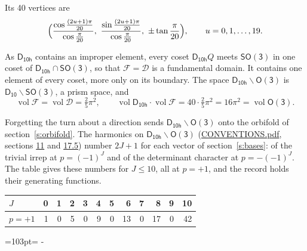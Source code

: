 \documentclass[10pt,a4paper]{article}
\newcommand{\needspace}[1]{\par\penalty-100\begingroup\dimen0=#1\relax\dimen2=\pagegoal
  \advance\dimen2-\pagetotal\ifdim\dimen0>\dimen2\relax\ifdim\dimen2>0pt\vfil\break\fi\fi
  \endgroup}
\numberwithin{equation}{section}
\newcommand{\grp}[1]{\mathsf{#1}}
\newcommand{\vol}{\operatorname{vol}}
\newcommand{\fcell}{\mathcal{D}}
\newcommand{\fdomain}{\mathcal{F}}
\begin{document}
\leavevmode\label{n:local.vertex.u}Its 40 vertices are
\begin{equation}\label{e:prism}\Bigl(\frac{\cos\frac{(2u+1)\pi}{20}}{\cos\frac{\pi}{20}},\ \frac{\sin\frac{(2u+1)\pi}{20}}{\cos\frac{\pi}{20}},\ \pm\tan\frac{\pi}{20}\Bigr),\qquad u = 0, 1, \dots, 19.\end{equation}

\leavevmode\label{n:set.fundamental}As $\grp{D_{10h}}$ contains an improper element, every coset $\grp{D_{10h}}Q$ meets \href{SO3.pdf}{$\grp{SO(3)}$} in one coset of $\grp{D_{10h}} \cap \grp{SO(3)}$, so that $\fdomain = \fcell$ is a fundamental domain. It contains one element of every coset, more only on its boundary.
The space $\grp{D_{10h}}\backslash\grp{O(3)}$ is $\grp{D_{10}}\backslash\grp{SO(3)}$, a prism space, and
\begin{equation}\label{e:volume}\vol\fdomain = \vol\fcell = \tfrac{2}{5}\pi^2,\qquad \vol\grp{D_{10h}}\cdot\vol\fdomain = 40\cdot \tfrac{2}{5}\pi^2 = 16\pi^2 = \vol\grp{O(3)}.\end{equation}

Forgetting the turn about a direction sends $\grp{D_{10h}}\backslash\grp{O(3)}$ onto the orbifold of section~\ref{s:orbifold}.
The harmonics on $\grp{D_{10h}}\backslash\grp{O(3)}$ (\href{../../CONVENTIONS.pdf}{CONVENTIONS.pdf}, sections \href{../../CONVENTIONS.pdf\#conv.11}{11} and \href{../../CONVENTIONS.pdf\#conv.17.5}{17.5}) number $2J + 1$ for each vector of section~\ref{s:bases}: of the trivial irrep at $p = (-1)^J$ and of the determinant character at $p = -(-1)^J$. The table gives these numbers for $J \le 10$, all at $p = +1$, and the record holds their generating functions.
{\small\setlength{\tabcolsep}{4pt}\begin{longtable}{@{}lrrrrrrrrrrr@{}}\toprule
$J$ & 0 & 1 & 2 & 3 & 4 & 5 & 6 & 7 & 8 & 9 & 10\\\midrule\endhead
\bottomrule\endfoot\endlastfoot
$p = +1$ & 1 & 0 & 5 & 0 & 9 & 0 & 13 & 0 & 17 & 0 & 42\\
\bottomrule\end{longtable}}
\needspace{103pt}
\end{document}
